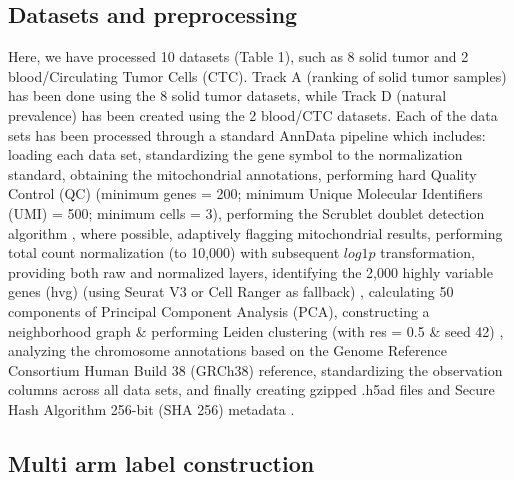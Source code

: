\documentclass[10pt]{article}
\begin{document}
\subsection{Datasets and preprocessing}

Here, we have processed 10 datasets (Table 1), such as 8 solid tumor and 2 blood/Circulating Tumor Cells (CTC). Track A (ranking of solid tumor samples) has been done using the 8 solid tumor datasets, while Track D (natural prevalence) has been created using the 2 blood/CTC datasets. Each of the data sets has been processed through a standard AnnData pipeline \cite{jovic2022single} which includes: loading each data set, standardizing the gene symbol to the normalization standard, obtaining the mitochondrial annotations, performing hard Quality Control (QC) (minimum genes = 200; minimum Unique Molecular Identifiers (UMI) = 500; minimum cells = 3), performing the Scrublet doublet detection algorithm \cite{jovic2022single}, where possible, adaptively flagging mitochondrial results, performing total count normalization (to 10,000) with subsequent $log 1p$ transformation, providing both raw and normalized layers\cite{tran2020benchmark}, identifying the 2,000 highly variable genes (hvg) (using Seurat V3 or Cell Ranger as fallback) \cite{tran2020benchmark,abdelaal2019comparison}, calculating 50 components of Principal Component Analysis (PCA), constructing a neighborhood graph \& performing Leiden clustering (with res = 0.5 \& seed 42) \cite{mahalanabis2022evaluation}, analyzing the chromosome annotations based on the Genome Reference Consortium Human Build 38 (GRCh38) reference, standardizing the observation columns across all data sets, and finally creating gzipped .h5ad files and Secure Hash Algorithm 256-bit (SHA 256) metadata \cite{cao2021benchmark}.

\subsection{Multi arm label construction}
\end{document}
